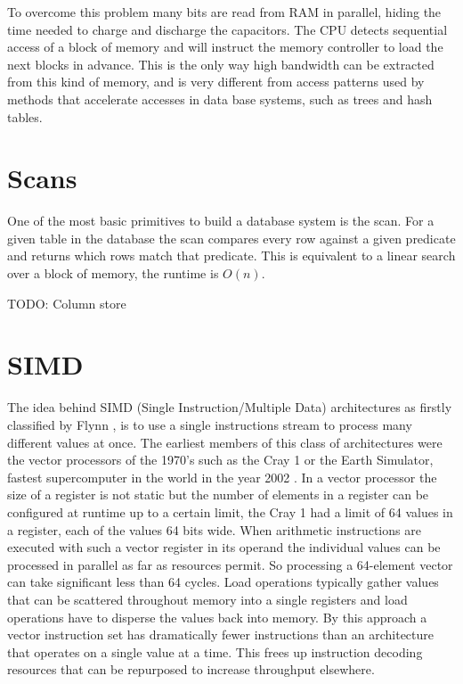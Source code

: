 To overcome this problem many bits are read from RAM in parallel, hiding the
time needed to charge and discharge the capacitors. The CPU detects sequential
access of a block of memory and will instruct the memory controller to load
the next blocks in advance. This is the only way high bandwidth can be extracted
from this kind of memory, and is very different from access patterns used by
methods that accelerate accesses in data base systems, such as trees and hash
tables.

\section{Scans}

One of the most basic primitives to build a database system is the scan. For a
given table in the database the scan compares every row against a given
predicate and returns which rows match that predicate. This is equivalent to a
linear search over a block of memory, the runtime is $O(n)$.

TODO: Column store

\section{SIMD}

The idea behind SIMD (Single Instruction/Multiple Data) architectures as
firstly classified by Flynn \cite{flynnsimd}, is to use a single instructions
stream to process many different values at once. The earliest members of this
class of architectures were the vector processors of the 1970's such as the
Cray 1 or the Earth Simulator, fastest supercomputer in the world in the year
2002 \cite{hennessyarch}. In a vector processor the size of a register is not
static but the number of elements in a register can be configured at runtime up
to a certain limit, the Cray 1 had a limit of 64 values in a register, each of
the values 64 bits wide. When arithmetic instructions are executed with such a
vector register in its operand the individual values can be processed in parallel
as far as resources permit. So processing a 64-element vector can take
significant less than 64 cycles. Load operations typically gather values that
can be scattered throughout memory into a single registers and load operations
have to disperse the values back into memory. By this approach a vector
instruction set has dramatically fewer instructions than an architecture that
operates on a single value at a time. This frees up instruction decoding
resources that can be repurposed to increase throughput elsewhere.

